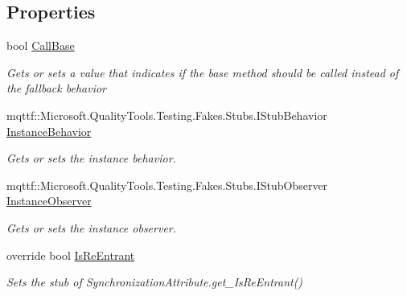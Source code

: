 \subsection*{Properties}
\begin{DoxyCompactItemize}
\item 
bool \hyperlink{class_system_1_1_runtime_1_1_remoting_1_1_contexts_1_1_fakes_1_1_stub_synchronization_attribute_a3167582c2a6d8ed512a8186631e95e28}{Call\-Base}
\begin{DoxyCompactList}\small\item\em Gets or sets a value that indicates if the base method should be called instead of the fallback behavior\end{DoxyCompactList}\item 
mqttf\-::\-Microsoft.\-Quality\-Tools.\-Testing.\-Fakes.\-Stubs.\-I\-Stub\-Behavior \hyperlink{class_system_1_1_runtime_1_1_remoting_1_1_contexts_1_1_fakes_1_1_stub_synchronization_attribute_aa801aa85b1345b112466b3f06c4f1219}{Instance\-Behavior}
\begin{DoxyCompactList}\small\item\em Gets or sets the instance behavior.\end{DoxyCompactList}\item 
mqttf\-::\-Microsoft.\-Quality\-Tools.\-Testing.\-Fakes.\-Stubs.\-I\-Stub\-Observer \hyperlink{class_system_1_1_runtime_1_1_remoting_1_1_contexts_1_1_fakes_1_1_stub_synchronization_attribute_adcaed458a8b11a24db40178877515045}{Instance\-Observer}
\begin{DoxyCompactList}\small\item\em Gets or sets the instance observer.\end{DoxyCompactList}\item 
override bool \hyperlink{class_system_1_1_runtime_1_1_remoting_1_1_contexts_1_1_fakes_1_1_stub_synchronization_attribute_a90562515685be33e603d977b56bacc54}{Is\-Re\-Entrant}
\begin{DoxyCompactList}\small\item\em Sets the stub of Synchronization\-Attribute.\-get\-\_\-\-Is\-Re\-Entrant()\end{DoxyCompactList}\item 

\end{DoxyCompactItemize}
